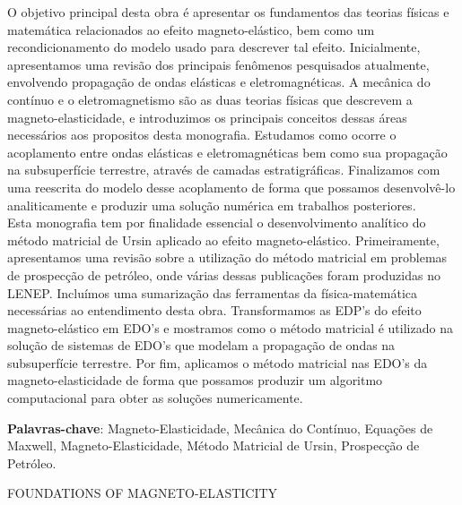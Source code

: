 \documentclass[12pt,a4paper,oneside]{abntex2}
\begin{document}
\begin{resumo}
O objetivo principal desta obra \'e apresentar os fundamentos das teorias f\'isicas e matem\'atica relacionados ao efeito magneto-el\'astico, bem como um recondicionamento do modelo usado para descrever tal efeito. Inicialmente, apresentamos uma revis\~ao dos principais fen\^omenos pesquisados atualmente, envolvendo propaga\c{c}\~ao de ondas el\'asticas e eletromagn\'eticas. A mec\^anica do cont\'inuo e o eletromagnetismo s\~ao as duas teorias f\'isicas que descrevem a magneto-elasticidade, e introduzimos os principais conceitos dessas \'areas necess\'arios aos propositos desta monografia. Estudamos como ocorre o acoplamento entre ondas el\'asticas e eletromagn\'eticas bem como sua propaga\c{c}\~ao na subsuperf\'icie terrestre, atrav\'es de camadas estratigr\'aficas. Finalizamos com uma reescrita do modelo desse acoplamento de forma que possamos desenvolv\^e-lo analiticamente e produzir uma solu\c{c}\~ao num\'erica em trabalhos posteriores.
\\
Esta monografia tem por finalidade essencial o desenvolvimento anal\'itico do m\'etodo matricial de Ursin aplicado ao efeito magneto-el\'astico. Primeiramente, apresentamos uma revis\~ao sobre a utiliza\c{c}\~ao do m\'etodo matricial em problemas de prospec\c{c}\~ao de petr\'oleo, onde v\'arias dessas publica\c{c}\~oes foram produzidas no LENEP. Inclu\'imos uma sumariza\c{c}\~ao das ferramentas da f\'isica-matem\'atica necess\'arias ao entendimento desta obra. Transformamos as EDP's do efeito magneto-el\'astico em EDO's e mostramos como o m\'etodo matricial \'e utilizado na solu\c{c}\~ao de sistemas de EDO's que modelam a propaga\c{c}\~ao de ondas na subsuperf\'icie terrestre. Por fim, aplicamos o m\'etodo matricial nas EDO's da magneto-elasticidade de forma que possamos produzir um algoritmo computacional para obter as solu\c{c}\~oes numericamente.


\vspace{\onelineskip} 
\noindent 
\textbf{Palavras-chave}: Magneto-Elasticidade, Mec\^anica do Cont\'inuo, Equa\c{c}\~oes de Maxwell, Magneto-Elasticidade, M\'etodo Matricial de Ursin, Prospec\c{c}\~ao de Petr\'oleo.
\end{resumo}

\begin{center}
{\ABNTEXchapterfont\Large FOUNDATIONS OF MAGNETO-ELASTICITY}\\\vspace{1cm}
\end{center}
\end{document}
